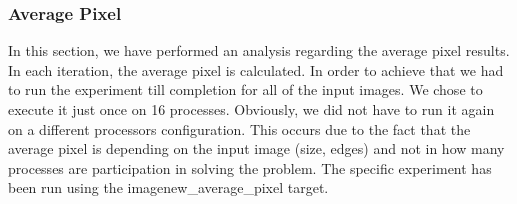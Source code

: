 \documentclass[12pt,a4paper]{article}
\begin{document}
        \subsubsection{Average Pixel}

        	In this section, we have performed an analysis regarding the average pixel results. In each iteration, the average pixel is calculated. In order to achieve that we had to run the experiment till completion for all of the input images. We chose to execute it just once on 16 processes. Obviously, we did not have to run it again on a different processors configuration. This occurs due to the fact that the average pixel is depending on the input image (size, edges) and not in how many processes are participation in solving the problem. The specific experiment has been run using the imagenew\_average\_pixel target.
\end{document}
